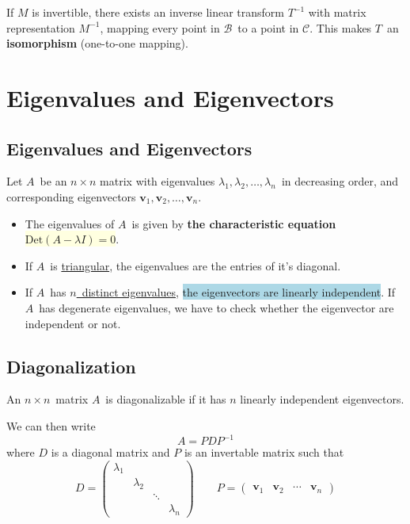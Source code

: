 \documentclass[12p,a4paper]{report}
\renewcommand{\b}{\boldsymbol}
\newcommand{\yll}{\colorbox{lightyellow}}
\newcommand{\bll}{\colorbox{lightblue}}
\begin{document}
If $M$ is invertible, there exists an inverse linear transform $T^{-1}$ with matrix representation $M^{-1}$, mapping every point in $\mathcal{B}$ to a point in $\mathcal{C}$. This makes $T$ an \textbf{isomorphism} (one-to-one mapping).





\chapter{Eigenvalues and Eigenvectors}
\section{Eigenvalues and Eigenvectors}
Let $A$ be an $n\times n$ matrix with eigenvalues $\lambda_1, \lambda_2,\dots, \lambda_n$ in decreasing order, and corresponding eigenvectors $\b v_1, \b v_2, \dots,\b v_n$.

\begin{itemize}
    \item The eigenvalues of $A$ is given by \textbf{the characteristic equation} \yll{$\text{Det}(A - \lambda I) = 0$}.
    \item If $A$ is \underline{triangular}, the eigenvalues are the entries of it's diagonal.
    \item If $A$ has \underline{$n$ distinct eigenvalues}, \bll{the eigenvectors are linearly independent}. If $A$ has degenerate eigenvalues, we have to check whether the eigenvector are independent or not.
\end{itemize}


\section{Diagonalization}
\begin{tcolorbox}[title={The Diagonalization Theorem}]
    An $n\times n$ matrix $A$ is diagonalizable if it has $n$ linearly independent eigenvectors.
\end{tcolorbox}

We can then write
\[
    A = P D P^{-1}
\]
where $D$ is a diagonal matrix and $P$ is an invertable matrix such that
\[
    D = \begin{pmatrix} \lambda_1 &           &         & \\
                                  & \lambda_2 &         & \\
                                  &           & \ddots  & \\
                                  &           &         & \lambda_n
        \end{pmatrix}
        \quad\quad
    P = \begin{pmatrix} \b v_1 & \b v_2 & \cdots & \b v_n \end{pmatrix}
\]
\end{document}
